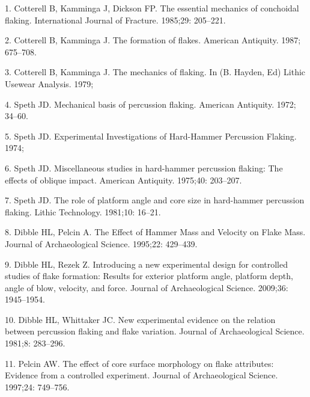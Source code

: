 \documentclass[10pt,letterpaper]{article}
\newenvironment{cslreferences}%
  {}%
  {\par}
\begin{document}
\hypertarget{refs}{}
\begin{cslreferences}
\leavevmode\hypertarget{ref-cotterell_essential_1985}{}%
1. Cotterell B, Kamminga J, Dickson FP. The essential mechanics of
conchoidal flaking. International Journal of Fracture. 1985;29:
205--221.

\leavevmode\hypertarget{ref-cotterell_formation_1987}{}%
2. Cotterell B, Kamminga J. The formation of flakes. American Antiquity.
1987; 675--708.

\leavevmode\hypertarget{ref-cotterell_mechanics_1979}{}%
3. Cotterell B, Kamminga J. The mechanics of flaking. In (B. Hayden, Ed)
Lithic Usewear Analysis. 1979;

\leavevmode\hypertarget{ref-speth_mechanical_1972}{}%
4. Speth JD. Mechanical basis of percussion flaking. American Antiquity.
1972; 34--60.

\leavevmode\hypertarget{ref-speth_experimental_1974}{}%
5. Speth JD. Experimental Investigations of Hard-Hammer Percussion
Flaking. 1974;

\leavevmode\hypertarget{ref-speth_miscellaneous_1975}{}%
6. Speth JD. Miscellaneous studies in hard-hammer percussion flaking:
The effects of oblique impact. American Antiquity. 1975;40: 203--207.

\leavevmode\hypertarget{ref-speth_role_1981}{}%
7. Speth JD. The role of platform angle and core size in hard-hammer
percussion flaking. Lithic Technology. 1981;10: 16--21.

\leavevmode\hypertarget{ref-dibble_effect_1995}{}%
8. Dibble HL, Pelcin A. The Effect of Hammer Mass and Velocity on Flake
Mass. Journal of Archaeological Science. 1995;22: 429--439.

\leavevmode\hypertarget{ref-dibble_introducing_2009-1}{}%
9. Dibble HL, Rezek Z. Introducing a new experimental design for
controlled studies of flake formation: Results for exterior platform
angle, platform depth, angle of blow, velocity, and force. Journal of
Archaeological Science. 2009;36: 1945--1954.

\leavevmode\hypertarget{ref-dibble_new_1981-1}{}%
10. Dibble HL, Whittaker JC. New experimental evidence on the relation
between percussion flaking and flake variation. Journal of
Archaeological Science. 1981;8: 283--296.

\leavevmode\hypertarget{ref-pelcin_effect_1997}{}%
11. Pelcin AW. The effect of core surface morphology on flake
attributes: Evidence from a controlled experiment. Journal of
Archaeological Science. 1997;24: 749--756.


\end{cslreferences}
\end{document}
